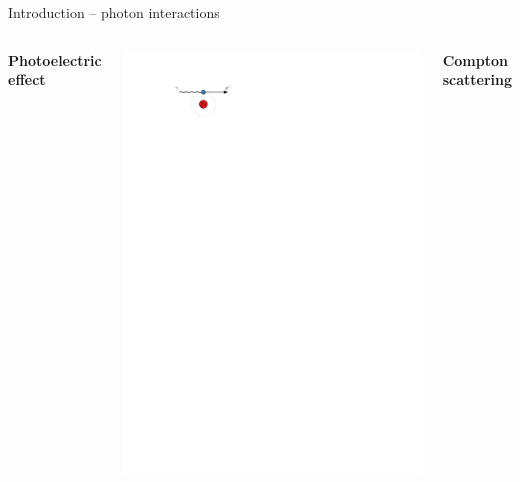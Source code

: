 \documentclass[11pt,xcolor=dvipsnames,professionalfonts]{beamer}
\begin{document}
\begin{frame}{Introduction -- photon interactions}	
	\begin{columns}
			\centering
			\textbf{Photoelectric effect}
			
			\vspace{1.15cm}
			
			\includegraphics[width=1.\textwidth]{./figures/photoeffect_intro.pdf}
		
		\pause
		
			\centering
			\textbf{Compton scattering}
			
			\vspace{.5cm}
			

\end{columns}
\end{frame}
\end{document}
